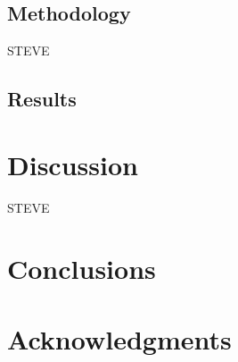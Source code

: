 \documentclass{sig-alternate}
\begin{document}
\subsection{Methodology}
STEVE
\subsection{Results}
\section{Discussion}
STEVE 
\section{Conclusions}
\section{Acknowledgments}


\end{document}
